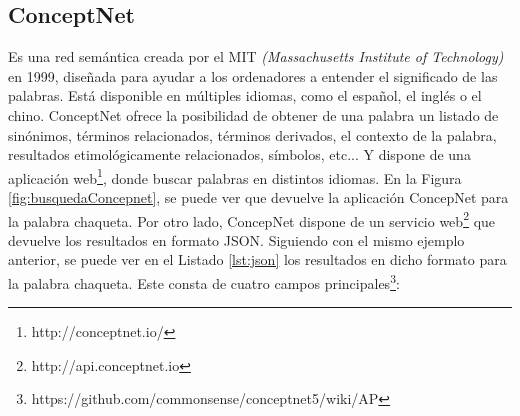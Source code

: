 \subsection{ConceptNet} 
\label{cap:subsec:concepnet}

Es una red semántica creada por el MIT \textit{(Massachusetts Institute of Technology)} en 1999, diseñada para ayudar a los ordenadores a entender el significado de las palabras. Está disponible en múltiples idiomas, como el español, el inglés o el chino. ConceptNet ofrece la posibilidad de obtener de una palabra un listado de sinónimos, términos relacionados, términos derivados, el contexto de la palabra, resultados etimológicamente relacionados, símbolos, etc... Y dispone de una aplicación web\footnote{http://conceptnet.io/}, donde  buscar palabras en distintos idiomas. En la Figura  \ref{fig:busquedaConcepnet}, se puede ver que  devuelve la aplicación ConcepNet para la palabra chaqueta.
Por otro lado, ConcepNet dispone de un servicio web\footnote{http://api.conceptnet.io} que devuelve los resultados en formato JSON. Siguiendo con el mismo ejemplo anterior, se puede ver en el Listado \ref{lst:json} los resultados en dicho formato para la palabra chaqueta. Este consta de cuatro campos principales\footnote{https://github.com/commonsense/conceptnet5/wiki/AP}:
